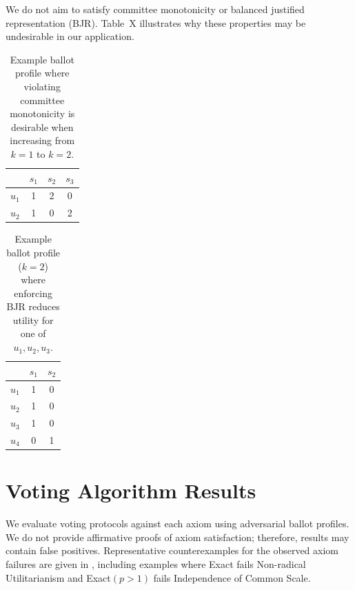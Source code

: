 \documentclass[11pt]{article}
\begin{document}
We do not aim to satisfy committee monotonicity or balanced justified representation (BJR). Table~X illustrates why these properties may be undesirable in our application.

\begin{table}[t]
\centering
\begin{tabular}{lccc}
\hline
 & $s_1$ & $s_2$ & $s_3$ \\
\hline
$u_1$ & 1 & 2 & 0 \\
$u_2$ & 1 & 0 & 2 \\
\hline
\end{tabular}
\caption{Example ballot profile where violating committee monotonicity is desirable when increasing from $k=1$ to $k=2$.}
\end{table}

\begin{table}[t]
\centering
\begin{tabular}{lcc}
\hline
 & $s_1$ & $s_2$ \\
\hline
$u_1$ & 1 & 0 \\
$u_2$ & 1 & 0 \\
$u_3$ & 1 & 0 \\
$u_4$ & 0 & 1 \\
\hline
\end{tabular}
\caption{Example ballot profile ($k=2$) where enforcing BJR reduces utility for one of $u_1, u_2,u_3$.}
\end{table}

\section{Voting Algorithm Results} \label{sec:voting-results}

We evaluate voting protocols against each axiom using adversarial ballot profiles. We do not provide affirmative proofs of axiom satisfaction; therefore, results may contain false positives.
Representative counterexamples for the observed axiom failures are given in , including examples where Exact fails Non-radical Utilitarianism and Exact$(p>1)$ fails Independence of Common Scale.
\end{document}
